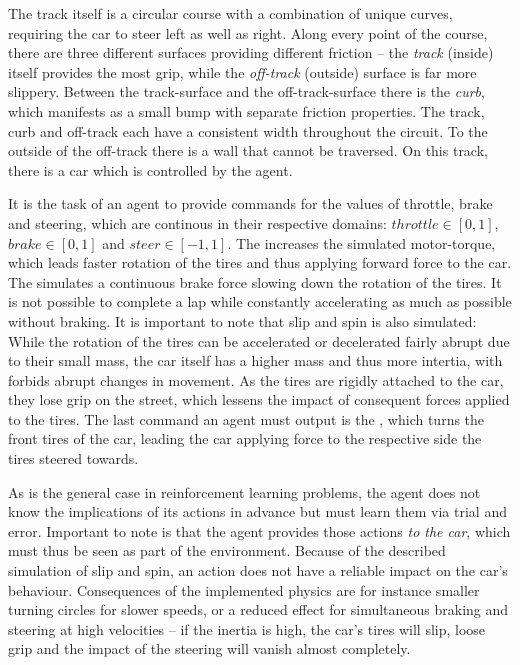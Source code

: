 The track itself is a circular course with a combination of unique curves, requiring the car to steer left as well as right. Along every point of the course, there are three different surfaces providing different friction -- the \textit{track} (inside) itself provides the most grip, while the \textit{off-track} (outside) surface is far more slippery. Between the track-surface and the off-track-surface there is the \textit{curb}, which manifests as a small bump with separate friction properties. The track, curb and off-track each have a consistent width throughout the circuit. To the outside of the off-track there is a wall that cannot be traversed. On this track, there is a car which is controlled by the agent.

It is the task of an agent to provide commands for the values of throttle, brake and steering, which are continous in their respective domains: $throttle \in [0,1]$, $brake \in [0,1]$ and $steer \in[-1,1]$. The  increases the simulated motor-torque, which leads faster rotation of the tires and thus applying forward force to the car. The  simulates a continuous brake force slowing down the rotation of the tires. It is not possible to complete a lap while constantly accelerating as much as possible without braking. It is important to note that slip and spin is also simulated: While the rotation of the tires can be accelerated or decelerated fairly abrupt due to their small mass, the car itself has a higher mass and thus more intertia, with forbids abrupt changes in movement. As the tires are rigidly attached to the car, they lose grip on the street, which lessens the impact of consequent forces applied to the tires. The last command an agent must output is the , which turns the front tires of the car, leading the car applying force to the respective side the tires steered towards.

As is the general case in reinforcement learning problems, the agent does not know the implications of its actions in advance but must learn them via trial and error. Important to note is that the agent provides those actions \textit{to the car}, which must thus be seen as part of the environment. Because of the described simulation of slip and spin, an action does not have a reliable impact on the car's behaviour. Consequences of the implemented physics are for instance smaller turning circles for slower speeds, or a reduced effect for simultaneous braking and steering at high velocities -- if the inertia is high, the car's tires will slip, loose grip and the impact of the steering will vanish almost completely.

